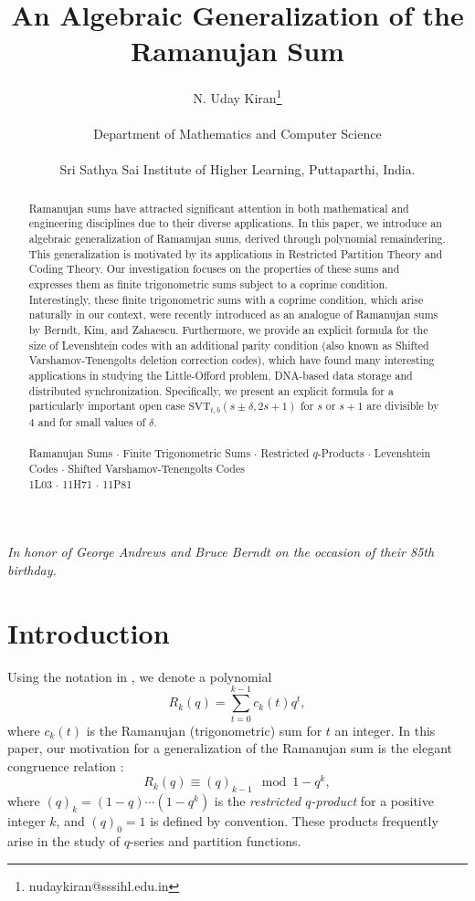 \documentclass[12pt]{article}
\title{\Large An Algebraic Generalization of the Ramanujan Sum}%
\author{\normalsize N. Uday Kiran\thanks{nudaykiran@sssihl.edu.in}  \\
	\begin{small}Department of Mathematics and Computer Science\end{small}\\
	\small Sri Sathya Sai Institute of Higher Learning, Puttaparthi, India.
}
\date{}
\providecommand{\keywords}[1]
{
	\small	
	\textbf{\text{Keywords:}} #1
}
\providecommand{\subclass}[1]
{
	\small	
	\textbf{\text{MSC(2010):}} #1
}
\begin{document}
\maketitle

\begin{center}        
        \textit{In honor of George Andrews and Bruce Berndt on the occasion of their 85th birthday.}
\end{center}

\vspace{0.1cm}
    
\begin{abstract}
Ramanujan sums have attracted significant attention in both mathematical and engineering disciplines due to their diverse applications. In this paper, we introduce an algebraic generalization of Ramanujan sums, derived through polynomial remaindering. This generalization is motivated by its applications in Restricted Partition Theory and Coding Theory. Our investigation focuses on the properties of these sums and expresses them as finite trigonometric sums subject to a coprime condition. Interestingly, these finite trigonometric sums with a coprime condition, which arise naturally in our context, were recently introduced as an analogue of Ramanujan sums by Berndt, Kim, and Zahaescu. Furthermore, we provide an explicit formula for the size of Levenshtein codes with an additional parity condition (also known as Shifted Varshamov-Tenengolts deletion correction codes), which have found many interesting applications in studying the Little-Offord problem, DNA-based data storage and distributed synchronization. Specifically, we present an explicit formula for a particularly important open case $\text{SVT}_{t,b}(s \pm \delta, 2s + 1)$ for $s$ or $s+1$ are divisible by $4$ and for small values of $\delta$.
\\
\\
		\keywords{ Ramanujan Sums $\cdot$ Finite Trigonometric Sums $\cdot$ Restricted $q$-Products $\cdot$ Levenshtein Codes $\cdot$ Shifted Varshamov-Tenengolts Codes}\\
		\subclass{1L03 $\cdot$  11H71 $\cdot$ 11P81}
\end{abstract}


\section{Introduction}
Using the notation in \cite{toth}, we denote a polynomial
\[
R_{k}(q) = \sum_{t=0}^{k-1} c_{k}(t) q^{t},
\]
where $c_{k}(t)$ is the Ramanujan (trigonometric) sum for $t$ an integer. In this paper, our motivation for a generalization of the Ramanujan sum is the elegant congruence relation \cite{uk}:
\begin{equation}\label{poly_rem_RS}
R_{k}(q) \equiv (q)_{k-1} \mod 1-q^{k},    
\end{equation}
where $(q)_{k}=(1-q)\cdots (1-q^{k})$ is the \textit{restricted $q$-product} for a positive integer $k$, and $(q)_{0}=1$ is defined by convention. These products frequently arise in the study of $q$-series and partition functions. 
\end{document}
